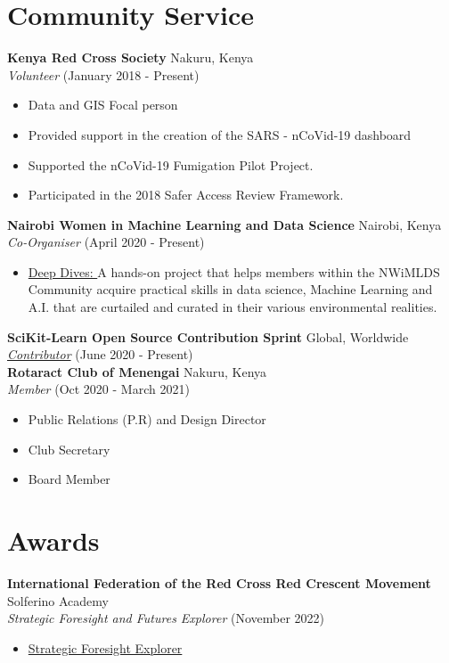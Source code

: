 \documentclass[line,margin,10pt]{res}
\begin{document}
\begin{resume}
\section{Community Service}
\textbf{Kenya Red Cross Society} \hfill Nakuru, Kenya\\
{\sl Volunteer} \hfill (January 2018 - Present)
\begin{itemize} \itemsep -2pt
    \item Data and GIS Focal person
    \item Provided support in the creation of the SARS - nCoVid-19 dashboard
    \item Supported the nCoVid-19 Fumigation Pilot Project.
    \item Participated in the 2018 Safer Access Review Framework.
\end{itemize}
\textbf{Nairobi Women in Machine Learning and Data Science} \hfill Nairobi, Kenya\\
{\sl Co-Organiser} \hfill (April 2020 - Present)
\begin{itemize} \itemsep -2pt
    \item \underline{Deep Dives: }
    A hands-on project that helps members within the NWiMLDS Community acquire practical skills in data science, Machine Learning and A.I. that are curtailed and curated in their various environmental realities.
\end{itemize}
\textbf{SciKit-Learn Open Source Contribution Sprint} \hfill Global, Worldwide\\
{\sl \href{https://sites.google.com/view/nyc-2020-scikit-sprint/contributors}{Contributor}} \hfill (June 2020 - Present) \\
\textbf{Rotaract Club of Menengai} \hfill Nakuru, Kenya\\
{\sl Member} \hfill (Oct 2020 - March 2021)
\begin{itemize} \itemsep -2pt
    \item Public Relations (P.R) and Design Director
    \item Club Secretary
    \item Board Member
\end{itemize}
{\vspace{-0,25cm}}

\section{Awards}
\textbf{International Federation of the Red Cross Red Crescent Movement} \hfill Solferino Academy\\
{\sl Strategic Foresight and Futures Explorer} \hfill (November 2022)
\begin{itemize} \itemsep -2pt
    \item \href{https://www.virtualbadge.io/certificate-validator?credential=cer-433e718d-cb4c-4c07-9436-1bbb67b6}{Strategic Foresight Explorer}
\end{itemize}
{\vspace{-0.25cm}}


\end{resume}
\end{document}
